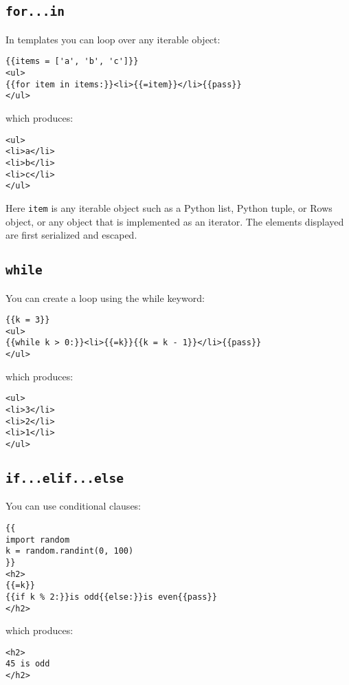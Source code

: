 \documentclass[justified,sixbynine,notoc]{tufte-book}
\def\ft{\small\tt}
\def\inxx#1{\index{#1}}
\begin{document}
\begin{fullwidth}
\goodbreak\subsection{{\ft for...in}}

\inxx{for}

In templates you can loop over any iterable object:
\begin{lstlisting}[keywords={}]
{{items = ['a', 'b', 'c']}}
<ul>
{{for item in items:}}<li>{{=item}}</li>{{pass}}
</ul>
\end{lstlisting}
\noindent which produces:
\begin{lstlisting}[keywords={}]
<ul>
<li>a</li>
<li>b</li>
<li>c</li>
</ul>
\end{lstlisting}

Here {\ft item} is any iterable object such as a Python list, Python tuple, or Rows object, or any object that is implemented as an iterator. The elements displayed are first serialized and escaped.

\goodbreak\subsection{{\ft while}}

\inxx{while}

You can create a loop using the while keyword:
\begin{lstlisting}[keywords={}]
{{k = 3}}
<ul>
{{while k > 0:}}<li>{{=k}}{{k = k - 1}}</li>{{pass}}
</ul>
\end{lstlisting}
\noindent which produces:
\begin{lstlisting}[keywords={}]
<ul>
<li>3</li>
<li>2</li>
<li>1</li>
</ul>
\end{lstlisting}

\goodbreak\subsection{{\ft if...elif...else}}

\inxx{if} \inxx{elif} \inxx{else}

You can use conditional clauses:
\begin{lstlisting}[keywords={}]
{{
import random
k = random.randint(0, 100)
}}
<h2>
{{=k}}
{{if k % 2:}}is odd{{else:}}is even{{pass}}
</h2>
\end{lstlisting}
\noindent which produces:
\begin{lstlisting}[keywords={}]
<h2>
45 is odd
</h2>
\end{lstlisting}


\end{fullwidth}
\end{document}
